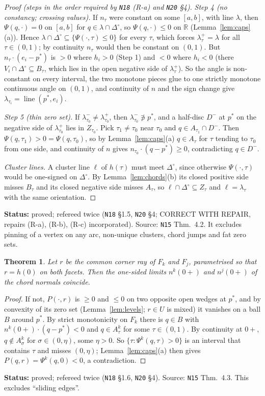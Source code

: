 \documentclass[11pt]{article}
\newtheorem{theorem}{Theorem}[section]
\theoremstyle{definition}
\theoremstyle{remark}
\newcommand{\R}{\mathbb R}
\newcommand{\Di}{\Delta^{\circ}}
\newcommand{\lin}{\operatorname{line}}
\newcommand{\src}[1]{\texttt{#1}}
\newcommand{\status}[1]{\par\smallskip\noindent\textbf{Status:} #1\par\smallskip}
\begin{document}
\begin{proof}[Proof (steps in the order required by \src{N18} (R-a) and \src{N20} \S4)]
\emph{Step 4 (no constancy; crossing values).} If $n_\tau$ were constant on some $[a,b]$, with line $\lambda$, then $\Psi(q,\cdot)=0$ on $[a,b]$ for $q\in\lambda\cap\Di$, so $\Psi(q,\cdot)\le0$ on $\R$ (Lemma~\ref{lem:caps}(a)). Hence $\lambda\cap\Di\subseteq\{\Psi(\cdot,\tau)\le0\}$ for every $\tau$, which forces $\lambda^+_\tau=\lambda$ for all $\tau\in(0,1)$; by continuity $n_\tau$ would then be constant on $(0,1)$. But $n_\tau\cdot(e_i-p^*)$ is $>0$ where $h_i>0$ (Step 1) and $<0$ where $h_i<0$ (there $V_i\cap\Di\subseteq B_\tau$, which lies in the open negative side of $\lambda^+_\tau$). So the angle is non-constant on every interval, the two monotone pieces glue to one strictly monotone continuous angle on $(0,1)$, and continuity of $n$ and the sign change give $\lambda_{\tau_i}=\lin(p^*,e_i)$.

\emph{Step 5 (thin zero set).} If $\lambda^-_{\tau_0}\ne\lambda^+_{\tau_0}$, then $\lambda^-_{\tau_0}\not\ni p^*$, and a half-disc $D^-$ at $p^*$ on the negative side of $\lambda^+_{\tau_0}$ lies in $Z_{\tau_0}$. Pick $\tau_1\ne\tau_0$ near $\tau_0$ and $q\in A_{\tau_1}\cap D^-$. Then $\Psi(q,\tau_1)>0=\Psi(q,\tau_0)$, so by Lemma~\ref{lem:caps}(a) $q\in A_\tau$ for $\tau$ tending to $\tau_0$ from one side, and continuity of $n$ gives $n_{\tau_0}\cdot(q-p^*)\ge0$, contradicting $q\in D^-$.

\emph{Cluster lines.} A cluster line $\ell$ of $h(\tau)$ must meet $\Di$, since otherwise $\Psi(\cdot,\tau)$ would be one-signed on $\Di$. By Lemma~\ref{lem:chords}(b) its closed positive side misses $B_\tau$ and its closed negative side misses $A_\tau$, so $\ell\cap\Di\subseteq Z_\tau$ and $\ell=\lambda_\tau$ with the same orientation.
\end{proof}
\status{proved; refereed twice (\src{N18} \S1.5, \src{N20} \S4; CORRECT WITH REPAIR, repairs (R-a), (R-b), (R-c) incorporated). Source: \src{N15} Thm.~4.2. It excludes pinning of a vertex on any arc, non-unique clusters, chord jumps and fat zero sets.}

\begin{theorem}\label{thm:nosliding}
Let $r$ be the common corner ray of $F_k$ and $F_j$, parametrised so that $r=h(0)$ on both facets. Then the one-sided limits $n^k(0+)$ and $n^j(0+)$ of the chord normals coincide.
\end{theorem}
\begin{proof}
If not, $P(\cdot,r)$ is $\ge0$ and $\le0$ on two opposite open wedges at $p^*$, and by convexity of its zero set (Lemma~\ref{lem:levels}; $r\in U$ is mixed) it vanishes on a ball $B$ around $p^*$. By strict monotonicity on $F_k$ there is $q\in B$ with $n^k(0+)\cdot(q-p^*)<0$ and $q\in A^k_\tau$ for some $\tau\in(0,1)$. By continuity at $0+$, $q\notin A^k_\sigma$ for $\sigma\in(0,\eta)$, some $\eta>0$. So $\{\tau:\Psi^k(q,\tau)>0\}$ is an interval that contains $\tau$ and misses $(0,\eta)$; Lemma~\ref{lem:caps}(a) then gives $P(q,r)=\Psi^k(q,0)<0$, a contradiction.
\end{proof}
\status{proved; refereed twice (\src{N18} \S1.6, \src{N20} \S4). Source: \src{N15} Thm.~4.3. This excludes ``sliding edges''.}
\end{document}
